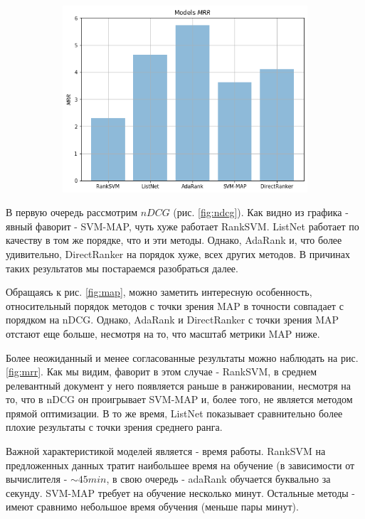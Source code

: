 \documentclass{article}[16pt]
\begin{document}
\begin{figure}[H]
\begin{subfigure}{.33\textwidth}
			\includegraphics[width=\textwidth]{images/mrr.png}
		\end{subfigure}
	\end{figure}
	
	В первую очередь рассмотрим $nDCG$ (рис. \ref{fig:ndcg}). Как видно из графика - явный фаворит - SVM-MAP, чуть хуже работает RankSVM. ListNet работает по качеству в том же порядке, что и эти методы. Однако, AdaRank и, что более удивительно, DirectRanker на порядок хуже, всех других методов. В причинах таких результатов мы постараемся разобраться далее. 
	
	Обращаясь к рис. \ref{fig:map}, можно заметить интересную особенность, относительный порядок методов с точки зрения MAP в точности совпадает с порядком на nDCG. Однако, AdaRank и DirectRanker с точки зрения  MAP отстают еще больше, несмотря на то, что масштаб метрики MAP ниже.
	
	Более неожиданный и менее согласованные результаты можно наблюдать на рис. \ref{fig:mrr}. Как мы видим, фаворит в этом случае - RankSVM, в среднем релевантный документ у него появляется раньше в ранжировании, несмотря на то, что в nDCG он проигрывает SVM-MAP и, более того, не является методом прямой оптимизации. В то же время, ListNet показывает сравнительно более плохие результаты с точки зрения среднего ранга. 
	
	Важной характеристикой моделей является - время работы. RankSVM на предложенных данных тратит наибольшее время на обучение (в зависимости от вычислителя - $\sim 45 min$, в свою очередь - adaRank обучается буквально за секунду. SVM-MAP требует на обучение несколько минут. Остальные методы - имеют сравнимо небольшое время обучения (меньше пары минут).
	
\end{document}

